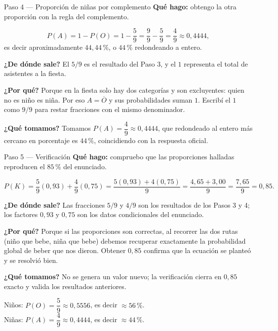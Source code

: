 \documentclass[11pt]{article}
\begin{document}
\begin{paso}{Paso 4 --- Proporción de niñas por complemento}
\textbf{Qué hago:} obtengo la otra proporción con la regla del complemento.

\[
P(A)=1-P(O)=1-\frac{5}{9}=\frac{9}{9}-\frac{5}{9}=\frac{4}{9}\approx 0{,}4444,
\]
es decir aproximadamente $44{,}44\,\%$, o $44\,\%$ redondeando a entero.

\textbf{¿De dónde sale?} El $5/9$ es el resultado del Paso 3, y el $1$ representa el total de asistentes a la fiesta.

\textbf{¿Por qué?} Porque en la fiesta solo hay dos categorías y son excluyentes: quien no es niño es niña. Por eso $A=\overline{O}$ y sus probabilidades suman $1$. Escribí el $1$ como $9/9$ para restar fracciones con el mismo denominador.

\textbf{¿Qué tomamos?} Tomamos $P(A)=\dfrac{4}{9}\approx 0{,}4444$, que redondeado al entero más cercano en porcentaje es $44\,\%$, coincidiendo con la respuesta oficial.
\end{paso}

\begin{paso}{Paso 5 --- Verificación}
\textbf{Qué hago:} compruebo que las proporciones halladas reproducen el $85\,\%$ del enunciado.

\[
P(K)=\frac{5}{9}(0{,}93)+\frac{4}{9}(0{,}75)
=\frac{5(0{,}93)+4(0{,}75)}{9}
=\frac{4{,}65+3{,}00}{9}
=\frac{7{,}65}{9}=0{,}85.
\]

\textbf{¿De dónde sale?} Las fracciones $5/9$ y $4/9$ son los resultados de los Pasos 3 y 4; los factores $0{,}93$ y $0{,}75$ son los datos condicionales del enunciado.

\textbf{¿Por qué?} Porque si las proporciones son correctas, al recorrer las dos rutas (niño que bebe, niña que bebe) debemos recuperar exactamente la probabilidad global de beber que nos dieron. Obtener $0{,}85$ confirma que la ecuación se planteó y se resolvió bien.

\textbf{¿Qué tomamos?} No se genera un valor nuevo; la verificación cierra en $0{,}85$ exacto y valida los resultados anteriores.
\end{paso}

\begin{resp}
Niños: $P(O)=\dfrac{5}{9}\approx 0{,}5556$, es decir $\approx 56\,\%$.\\[2pt]
Niñas: $P(A)=\dfrac{4}{9}\approx 0{,}4444$, es decir $\approx 44\,\%$.
\end{resp}

\end{document}
